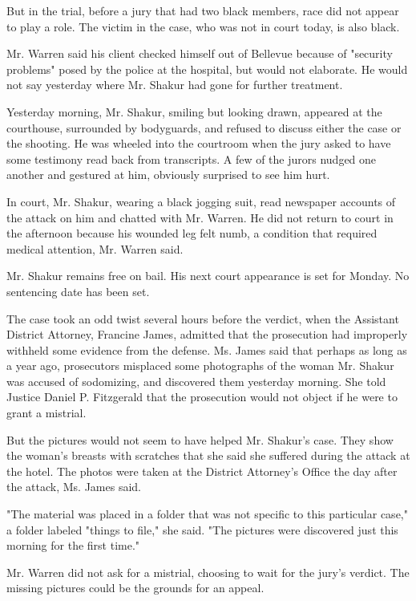 But in the trial, before a jury that had two black members, race did not
appear to play a role. The victim in the case, who was not in court
today, is also black.

Mr. Warren said his client checked himself out of Bellevue because of
"security problems" posed by the police at the hospital, but would not
elaborate. He would not say yesterday where Mr. Shakur had gone for
further treatment.

Yesterday morning, Mr. Shakur, smiling but looking drawn, appeared at
the courthouse, surrounded by bodyguards, and refused to discuss either
the case or the shooting. He was wheeled into the courtroom when the
jury asked to have some testimony read back from transcripts. A few of
the jurors nudged one another and gestured at him, obviously surprised
to see him hurt.

In court, Mr. Shakur, wearing a black jogging suit, read newspaper
accounts of the attack on him and chatted with Mr. Warren. He did not
return to court in the afternoon because his wounded leg felt numb, a
condition that required medical attention, Mr. Warren said.

Mr. Shakur remains free on bail. His next court appearance is set for
Monday. No sentencing date has been set.

The case took an odd twist several hours before the verdict, when the
Assistant District Attorney, Francine James, admitted that the
prosecution had improperly withheld some evidence from the defense. Ms.
James said that perhaps as long as a year ago, prosecutors misplaced
some photographs of the woman Mr. Shakur was accused of sodomizing, and
discovered them yesterday morning. She told Justice Daniel P. Fitzgerald
that the prosecution would not object if he were to grant a mistrial.

But the pictures would not seem to have helped Mr. Shakur's case. They
show the woman's breasts with scratches that she said she suffered
during the attack at the hotel. The photos were taken at the District
Attorney's Office the day after the attack, Ms. James said.

"The material was placed in a folder that was not specific to this
particular case," a folder labeled "things to file," she said. "The
pictures were discovered just this morning for the first time."

Mr. Warren did not ask for a mistrial, choosing to wait for the jury's
verdict. The missing pictures could be the grounds for an appeal.

